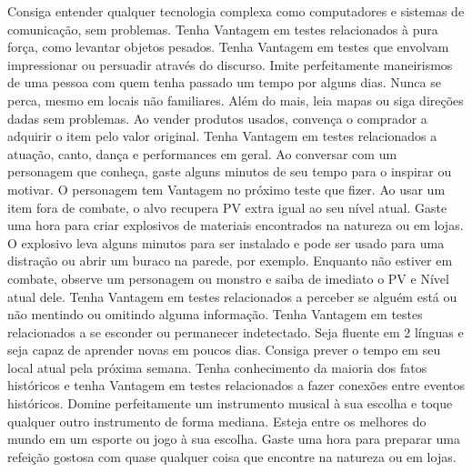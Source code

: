 \vfill
{}
{
	Consiga entender qualquer tecnologia complexa como computadores e sistemas de comunicação, sem problemas.
}
\vfill
{}
{
	Tenha Vantagem em testes relacionados à pura força, como levantar objetos pesados.
}
\vfill
{}
{
	Tenha Vantagem em testes que envolvam impressionar ou persuadir através do discurso.
}
\vfill
{}
{
	Imite perfeitamente maneirismos de uma pessoa com quem tenha passado um tempo por alguns dias. 
}
\vfill
{}
{
	Nunca se perca, mesmo em locais não familiares. 
	Além do mais, leia mapas ou siga direções dadas sem problemas. 
}
\vfill
{}
{
	Ao vender produtos usados, convença o comprador a adquirir o item pelo valor original.
}
\vfill
{}
{
	Tenha Vantagem em testes relacionados a atuação, canto, dança e performances em geral.
}
\vfill
{}
{
	Ao conversar com um personagem que conheça, gaste alguns minutos de seu tempo para o inspirar ou motivar.
	O personagem tem Vantagem no próximo teste que fizer.
}
\vfill
{}
{
	Ao usar um item fora de combate, o alvo recupera PV extra igual ao seu nível atual.
}
\vfill
{} 
{
	Gaste uma hora para criar explosivos de materiais encontrados na natureza ou em lojas. 
	O explosivo leva alguns minutos para ser instalado e pode ser usado para uma distração ou abrir um buraco na parede, por exemplo.
}
\vfill
{}
{
	Enquanto não estiver em combate, observe um personagem ou monstro e saiba de imediato o PV e Nível atual dele.
}
\vfill
{}
{
	Tenha Vantagem em testes relacionados a perceber se alguém está ou não mentindo ou omitindo alguma informação.
}
%
\newpage
%
{
	Tenha Vantagem em testes relacionados a se esconder ou permanecer indetectado.
}
\vfill
{}
{
	Seja fluente em 2 línguas e seja capaz de aprender novas em poucos dias. 
}
\vfill
{}
{
	Consiga prever o tempo em seu local atual pela próxima semana. 
}
\vfill
{}
{
	Tenha conhecimento da maioria dos fatos históricos e tenha Vantagem em testes relacionados a fazer conexões entre eventos históricos.
}
\vfill
{}
{
	Domine perfeitamente um instrumento musical à sua escolha e toque qualquer outro instrumento de forma mediana.
}
\vfill
{}
{
	Esteja entre os melhores do mundo em um esporte ou jogo à sua escolha.
}
\vfill
{}
{
	Gaste uma hora para preparar uma refeição gostosa com quase qualquer coisa que encontre na natureza ou em lojas.
}
